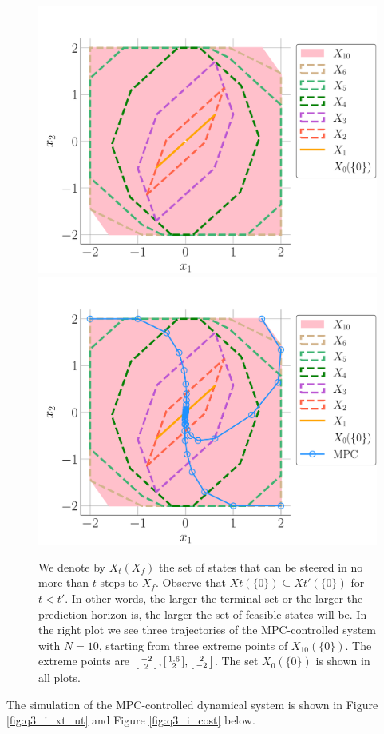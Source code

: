 \documentclass[a4paper,11pt,reqno]{amsart}
\begin{document}
\begin{figure}[H]
    \centering
    \vspace{-0.35cm}
    \includegraphics[width=0.45\linewidth]{figures/q3_i_X.pdf}
    \includegraphics[width=0.45\linewidth]{figures/q3_i_X_x.pdf}
    \caption{We denote by $X_t(X_f)$ the set of states that can be steered in no more than $t$
    steps to $X_f$. Observe that $Xt(\{0\})\subseteq Xt'(\{0\})$ for $t < t'$. In
    other words, the larger the terminal set or the larger the prediction horizon is, the larger
    the set of feasible states will be. In the right plot we see three trajectories of the
    MPC-controlled system with $N = 10$, starting from three extreme points of $X_{10}(\{0\})$. The extreme points are $\begin{bsmallmatrix}-2\\2\end{bsmallmatrix}, \begin{bsmallmatrix}1.6\\2\end{bsmallmatrix}, \begin{bsmallmatrix}2\\-2\end{bsmallmatrix}$. The set
    $X_0(\{0\})$ is shown in all plots.
    \label{fig:q3_i_Xx}}
\end{figure}
The simulation of the MPC-controlled dynamical system is shown in Figure \ref{fig:q3_i_xt_ut} and Figure \ref{fig:q3_i_cost} below.
\end{document}
